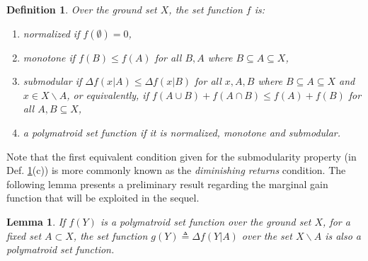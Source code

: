 \documentclass[conference]{IEEEtran}
\newtheorem{lemma}{Lemma}
\newtheorem{definition}{Definition}
\begin{document}
\begin{definition} \label{Def:Submodularity}
Over the ground set $X$, the set function $f$ is:
\begin{enumerate}[label=(\alph*)]
    \item \emph{normalized} if $f(\emptyset) = 0$,
    \item \emph{monotone} if $f(B) \leq f(A)$ for all $B,A$ where $B \subseteq A \subseteq X$,
    \item \emph{submodular} if $\Delta f(x\vert A) \leq \Delta f(x\vert B)$ for all $x,A,B$ where $B\subseteq A \subseteq X$ and $x\in X \backslash A$, or equivalently, if $f(A\cup B) + f(A\cap B) \leq f(A) + f(B)$ for all $A,B\subseteq X$,
    \item a \emph{polymatroid} set function \cite{Liu2018} if it is normalized, monotone and submodular. 
\end{enumerate}
\end{definition}



Note that the first equivalent condition given for the submodularity property (in Def. \ref{Def:Submodularity}(c)) is more commonly known as the \emph{diminishing returns} condition. The following lemma presents a preliminary result regarding the marginal gain function that will be exploited in the sequel. 

\begin{lemma}\label{Lm:MarginalGain}
If $f(Y)$ is a polymatroid set function over the ground set $X$, for a fixed set $A\subset X$, the set function $g(Y) \triangleq \Delta f(Y \vert A)$ over the set $X \backslash A$ is also a  polymatroid set function.
\end{lemma}
\end{document}
